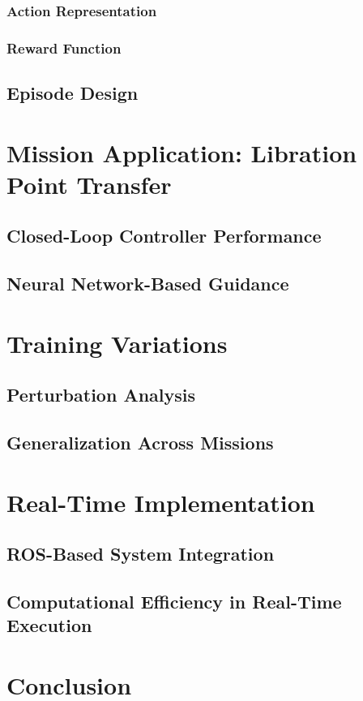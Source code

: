 \documentclass[conference]{IEEEtran}
\begin{document}
\subsubsection{Action Representation}
\subsubsection{Reward Function}
\subsection{Episode Design}
\section{Mission Application: Libration Point Transfer}
\subsection{Closed-Loop Controller Performance}
\subsection{Neural Network-Based Guidance}
\section{Training Variations}
\subsection{Perturbation Analysis}
\subsection{Generalization Across Missions}
\section{Real-Time Implementation}
\subsection{ROS-Based System Integration}
\subsection{Computational Efficiency in Real-Time Execution}
\section{Conclusion}
\end{document}
